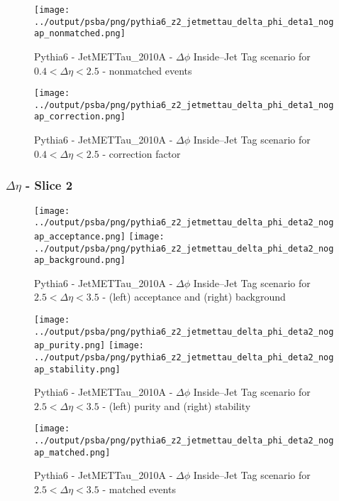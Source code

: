 \documentclass[11pt]{book}
\begin{document}
\begin{figure}[ht]
\centering
\texttt{[image: ../output/psba/png/pythia6\_z2\_jetmettau\_delta\_phi\_deta1\_nogap\_nonmatched.png]}
\caption{Pythia6 - JetMETTau\_2010A - $\Delta\phi$ Inside--Jet Tag scenario for $0.4 < \Delta\eta < 2.5$ - nonmatched events}
\label{fig:p6_jetmettau_delta_phi_deta1_nogap_nonmatched}
\end{figure}

\begin{figure}[ht]
\centering
\texttt{[image: ../output/psba/png/pythia6\_z2\_jetmettau\_delta\_phi\_deta1\_nogap\_correction.png]}
\caption{Pythia6 - JetMETTau\_2010A - $\Delta\phi$ Inside--Jet Tag scenario for $0.4 < \Delta\eta < 2.5$ - correction factor}
\label{fig:p6_jetmettau_delta_phi_deta1_nogap_correction}
\end{figure}

\clearpage
\subsubsection{$\Delta\eta$ - Slice 2}
\begin{figure}[ht]
\centering
\texttt{[image: ../output/psba/png/pythia6\_z2\_jetmettau\_delta\_phi\_deta2\_nogap\_acceptance.png]}
\texttt{[image: ../output/psba/png/pythia6\_z2\_jetmettau\_delta\_phi\_deta2\_nogap\_background.png]}
\caption{Pythia6 - JetMETTau\_2010A - $\Delta\phi$ Inside--Jet Tag scenario for $2.5 < \Delta\eta < 3.5$ - (left) acceptance and (right) background}
\label{fig:p6_jetmettau_delta_phi_deta2_nogap_ab}
\end{figure}

\begin{figure}[ht]
\centering
\texttt{[image: ../output/psba/png/pythia6\_z2\_jetmettau\_delta\_phi\_deta2\_nogap\_purity.png]}
\texttt{[image: ../output/psba/png/pythia6\_z2\_jetmettau\_delta\_phi\_deta2\_nogap\_stability.png]}
\caption{Pythia6 - JetMETTau\_2010A - $\Delta\phi$ Inside--Jet Tag scenario for $2.5 < \Delta\eta < 3.5$ - (left) purity and (right) stability}
\label{fig:p6_jetmettau_delta_phi_deta2_nogap_ps}
\end{figure}

\begin{figure}[ht]
\centering
\texttt{[image: ../output/psba/png/pythia6\_z2\_jetmettau\_delta\_phi\_deta2\_nogap\_matched.png]}
\caption{Pythia6 - JetMETTau\_2010A - $\Delta\phi$ Inside--Jet Tag scenario for $2.5 < \Delta\eta < 3.5$ - matched events}
\label{fig:p6_jetmettau_delta_phi_deta2_nogap_matched}
\end{figure}
\end{document}
